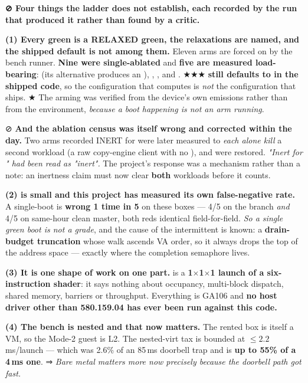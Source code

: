 \documentclass[10.5pt]{article}
\begin{document}
\begin{warnbox}\small
\textbf{⊘ Four things the ladder does not establish, each recorded by the run that produced it
rather than found by a critic.}

\smallskip
\textbf{(1) Every green is a RELAXED green, the relaxations are named, and the shipped default is
not among them.} Eleven arms are forced on by the bench runner. \textbf{Nine were single-ablated}
and \textbf{five are measured load-bearing}:  (its alternative produces
an ), , ,
 and . ★★★ \textbf{
still defaults to  in the shipped code}, so the configuration that computes is
\emph{not} the configuration that ships. ★ The arming was verified from the device's own emissions
rather than from the environment, \emph{because a boot happening is not an arm running}.

\smallskip
⊘ \textbf{And the ablation census was itself wrong and corrected within the day.} Two arms
recorded INERT for  were later measured to \emph{each alone kill} a second workload (a
raw copy-engine client with no ), and were restored. \emph{"Inert for "
had been read as "inert".} The project's response was a mechanism rather than a note: an
inertness claim must now clear \textbf{both} workloads before it counts.

\smallskip
\textbf{(2)  is small and this project has measured its own false-negative rate.} A
single-boot  is \textbf{wrong 1 time in 5} on these boxes — 4/5 on the branch \emph{and}
4/5 on same-hour clean master, both reds identical field-for-field. \emph{So a single green boot
is not a grade}, and the cause of the intermittent is known: a \textbf{drain-budget truncation}
whose walk ascends VA order, so it always drops the top of the address space — exactly where the
completion semaphore lives.

\smallskip
\textbf{(3) It is one shape of work on one part.}  is a \textbf{1$\times$1$\times$1
launch of a six-instruction shader}: it says nothing about occupancy, multi-block dispatch, shared
memory, barriers or throughput. Everything is GA106 and \textbf{no host driver other than
580.159.04 has ever been run against this code.}

\smallskip
\textbf{(4) The bench is nested and that now matters.} The rented box is itself a VM, so the
Mode-2 guest is L2. The nested-virt tax is bounded at $\leq 2.2$\,ms/launch — which was 2.6\% of
an 85\,ms doorbell trap and is \textbf{up to 55\% of a 4\,ms one}. ⇒ \emph{Bare metal matters more
now precisely because the doorbell path got fast.}
\end{warnbox}
\end{document}
